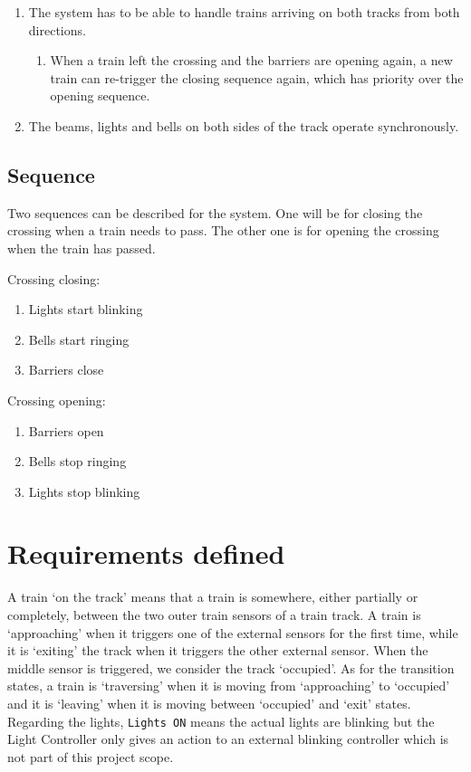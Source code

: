 \documentclass[final]{report}
\begin{document}
\begin{enumerate}
\item The system has to be able to handle trains arriving on both tracks from both directions.
	\begin{enumerate}
	\item When a train left the crossing and the barriers are opening again, a new train can re-trigger the closing sequence again, which has priority over the opening sequence.
	\end{enumerate}

\item The beams, lights and bells on both sides of the track operate synchronously.
\end{enumerate}


\subsection{Sequence}
Two sequences can be described for the system.
One will be for closing the crossing when a train needs to pass.
The other one is for opening the crossing when the train has passed.

Crossing closing:
\begin{enumerate}
\item Lights start blinking
\item Bells start ringing
\item Barriers close
\end{enumerate}

Crossing opening:
\begin{enumerate}
\item Barriers open
\item Bells stop ringing
\item Lights stop blinking
\end{enumerate}

\section{Requirements defined}
A train `on the track' means that a train is somewhere, either partially or completely, between the two outer train sensors of a train track.
A train is `approaching' when it triggers one of the external sensors for the first time, while it is `exiting' the track when it triggers the other external sensor.
When the middle sensor is triggered, we consider the track `occupied'.
As for the transition states, a train is `traversing' when it is moving from `approaching' to `occupied' and it is `leaving' when it is moving between `occupied' and `exit' states.\\
Regarding the lights, \texttt{Lights ON} means the actual lights are blinking but the Light Controller only gives an action to an external blinking controller which is not part of this project scope.
\end{document}

